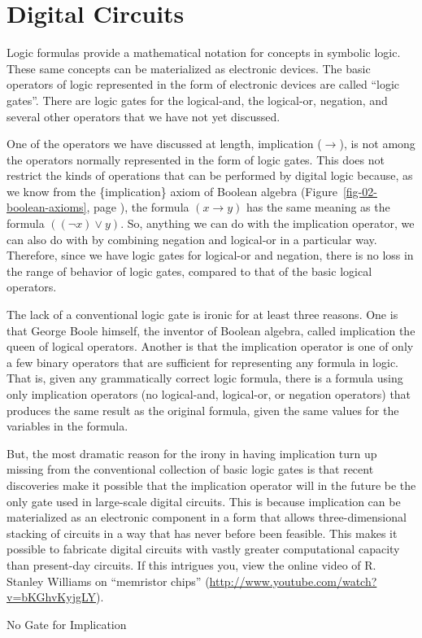 \section{Digital Circuits}

Logic formulas provide a mathematical notation for concepts in symbolic logic.
These same concepts can be materialized as electronic devices.
The basic operators of logic represented in the form of electronic devices
are called ``logic gates''.
There are logic gates for the logical-and, the logical-or, negation, and
several other operators that we have not yet discussed.

\begin{aside}
One of the operators we have discussed at length, implication
($\rightarrow$), is not among the operators normally represented
in the form of logic gates. This does not restrict the kinds of
operations that can be performed by digital logic because,
as we know from the \{implication\} axiom of Boolean algebra
(Figure~\ref{fig-02-boolean-axioms}, page \pageref{fig-02-boolean-axioms}),
the formula $(x \rightarrow y)$ has the same meaning as the
formula $((\neg x) \vee y)$. So, anything we can do with
the implication operator, we can also do with by combining
negation and logical-or in a particular way.
Therefore, since we have logic gates for logical-or and negation,
there is no loss in the range of behavior of logic
gates, compared to that of the basic logical operators.

The lack of a conventional logic gate is ironic for at least three reasons.
One is that George Boole himself, the inventor of Boolean algebra,
called implication the queen of logical operators.
Another is that the implication operator is one of only a few binary operators
that are sufficient for representing any formula in logic. That is, given
any grammatically correct logic formula, there is a formula using only
implication operators (no logical-and, logical-or, or negation operators)
that produces the same result as the original formula, given the same
values for the variables in the formula.

But, the most dramatic reason for the irony in having implication
turn up missing from the conventional collection of basic logic gates
is that recent discoveries make it possible that the
implication operator will in the future be the only gate used in
large-scale digital circuits.
This is because implication can be materialized
as an electronic component in a form that allows three-dimensional
stacking of circuits in a way that has never before been feasible.
This makes it possible to fabricate digital circuits with vastly greater
computational capacity than present-day circuits.
If this intrigues you, view the online video of
R. Stanley Williams on ``memristor chips''
(\url{http://www.youtube.com/watch?v=bKGhvKyjgLY}).
\caption{No Gate for Implication}
\label{no-implication-gate}
\end{aside}

